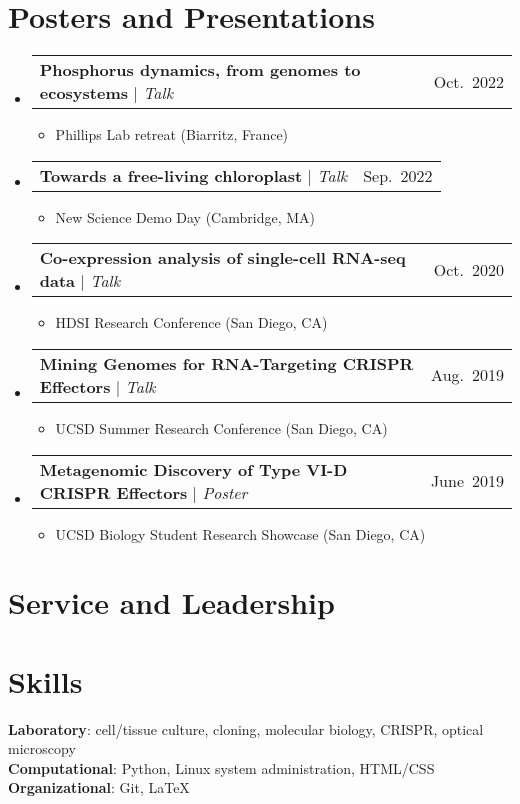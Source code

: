 \documentclass[letterpaper,11pt]{article}
\makeatletter
\newcommand{\resumeItem}[1]{
  \item
  \begin{minipage}[t]{0.7\textwidth}
    \small #1 
  \end{minipage}
}
\newcommand{\resumeEntry}[2]{
  \item
  \begin{tabular*}{0.97\textwidth}{l@{\extracolsep{\fill}}r}
    \small#1 & \small#2 \\
  \end{tabular*}
  \vspace{-7pt}
}
\newcommand{\resumeSubHeadingListStart}{
  \begin{itemize}[leftmargin=0.15in, label={}]
}
\newcommand{\resumeSubHeadingListEnd}{
  \end{itemize}
}
\newcommand{\resumeItemListStart}{
  \begin{itemize}[itemsep=.5pt]
}
\newcommand{\resumeItemListEnd}{
  \end{itemize}
  \vspace{-2pt}
}
\makeatother
\begin{document}
\section{Posters and Presentations}
    \resumeSubHeadingListStart
      \resumeEntry
          {\textbf{Phosphorus dynamics, from genomes to ecosystems} $|$ \emph{Talk}}{Oct.\ 2022}
          \resumeItemListStart
            \resumeItem{Phillips Lab retreat (Biarritz, France)}
          \resumeItemListEnd
      \resumeEntry
          {\textbf{Towards a free-living chloroplast} $|$ \emph{Talk}}{Sep.\ 2022}
          \resumeItemListStart
            \resumeItem{New Science Demo Day (Cambridge, MA)}
          \resumeItemListEnd
      \resumeEntry
          {\textbf{Co-expression analysis of single-cell RNA-seq data} $|$ \emph{Talk}}{Oct.\ 2020}
          \resumeItemListStart
            \resumeItem{HDSI Research Conference (San Diego, CA)}
          \resumeItemListEnd
      \resumeEntry
          {\textbf{Mining Genomes for RNA-Targeting CRISPR Effectors} $|$ \emph{Talk}}{Aug.\ 2019}
          \resumeItemListStart
            \resumeItem{UCSD Summer Research Conference (San Diego, CA)}
          \resumeItemListEnd
      \resumeEntry
          {\textbf{Metagenomic Discovery of Type VI-D CRISPR Effectors} $|$ \emph{Poster}}{June\ 2019}
          \resumeItemListStart
            \resumeItem{UCSD Biology Student Research Showcase (San Diego, CA)}
          \resumeItemListEnd
    \resumeSubHeadingListEnd

  
  
\section{Service and Leadership}



\section{Skills}

\resumeSubHeadingListStart
    \small{\item{
    \textbf{Laboratory}{: cell/tissue culture, cloning, molecular biology, CRISPR, optical microscopy} \\
    \textbf{Computational}{: Python, Linux system administration, HTML/CSS} \\
    \textbf{Organizational}{: Git, \LaTeX} \\}}
\resumeSubHeadingListEnd


\end{document}
